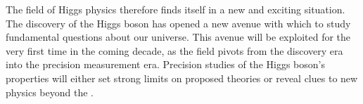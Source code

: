 The field of Higgs physics therefore finds itself in a new and exciting situation. The discovery of the Higgs boson has opened a new avenue with which to study fundamental questions about our universe. This avenue will be exploited for the very first time in the coming decade, as the field pivots from the discovery era into the precision measurement era. Precision studies of the Higgs boson's properties will either set strong limits on proposed theories or reveal clues to new physics beyond the \SM. 

